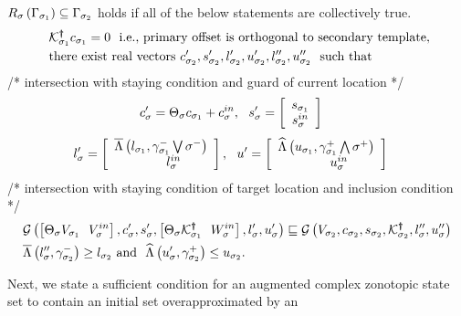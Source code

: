 \begin{lemma}
\begin{enumerate}
  $R_{\sigma}\left(\Gamma_{\sigma_{1}}\right)
  \subseteq \Gamma_{\sigma_{2}}$ holds if 
  all of the below statements are collectively true.
\begin{align}~\label{eqn:edgeinv}
\begin{split}
& \mathcal{K}^{\bm{\dagger}}_{\sigma_{1}}c_{\sigma_{1}} =
  0~~\text{i.e., primary offset is orthogonal to
  secondary template},\\
& \text{there exist real
    vectors}~c^\prime_{\sigma_{2}},s^\prime_{\sigma_{2}},l^\prime_{\sigma_{2}},u^\prime_{\sigma_{2}},l^{\prime\prime}_{\sigma_{2}},u^{\prime\prime}_{\sigma_{2}}~~\text{such
  that}
\end{split}
\end{align}
/* intersection with staying condition and guard of current location */
\vspace{-0.9em}
\begin{align}
& c^\prime_\sigma = \Theta_\sigma c_{\sigma_{1}}+c^{in}_\sigma,~~s^\prime_\sigma =
  \left[\begin{array}{c}{s_{\sigma_{1}}}\\{s^{in}_\sigma} \end{array}\right]
\end{align}
\vspace{-1.5em}
\begin{align}
& l^\prime_\sigma =
  \left[\begin{array}{c}{\overline{\Lambda}\left(l_{\sigma_{1}},\gamma^-_{\sigma_{1}}\bigvee\sigma^-\right)}\\{~~~~~~~~~l^{in}_{\sigma}~~~} \end{array}\right],~~u^\prime =
  \left[\begin{array}{c}{\widehat{\Lambda}\left(u_{\sigma_{1}},\gamma^+_{\sigma_{1}}\bigwedge\sigma^+\right)}\\{~~~~~~~~~u^{in}_\sigma~~~} \end{array}\right]
\end{align}
/*  intersection with staying condition of target location and inclusion condition */
\begin{align}
& \mathcal{G}\left(\left[\Theta_\sigma V_{\sigma_{1}}~~V^{in}_{\sigma}\right],c^\prime_\sigma,s^\prime_\sigma,\left[\Theta_\sigma\mathcal{K}^{\bm{\dagger}}_{\sigma_{1}}~~W^{in}_\sigma\right],l^\prime_\sigma,u^\prime_\sigma\right)
 \sqsubseteq
   \mathcal{G}\left(V_{\sigma_{2}},c_{\sigma_{2}},s_{\sigma_{2}},\mathcal{K}^{\bm{\dagger}}_{\sigma_{2}},l^{\prime\prime}_\sigma,u^{\prime\prime}_\sigma\right) \nonumber \\
& \overline{\Lambda}\left(l^{\prime\prime}_\sigma,\gamma^-_{\sigma_{2}}\right)\geq l_{\sigma_{2}}~\text{and}~~
\widehat{\Lambda}\left(u^\prime_\sigma,\gamma^+_{\sigma_{2}}\right)\leq u_{\sigma_{2}}.
\end{align}
\vspace{-1.5em}
\end{enumerate}
\end{lemma}
%
Next, we state a sufficient condition for an augmented complex
zonotopic state set to contain an initial set overapproximated by an
